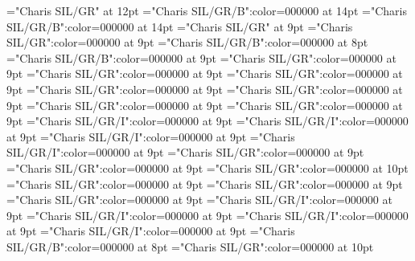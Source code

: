 \documentclass[gps1,twoside]{article}
\begin{document}
\font\xitemtpi="Charis SIL/GR" at 12pt
\font{}="Charis SIL/GR/B":color=000000 at 14pt
\font{}="Charis SIL/GR/B":color=000000 at 14pt
\font{}="Charis SIL/GR" at 9pt
\font\entryletDatadicBody="Charis SIL/GR":color=000000 at 9pt
\font\headwordggoTeluINentryletDatadicBody="Charis SIL/GR/B":color=000000 at 8pt
\font\spanenheadwordggoTeluINentryletDatadicBody="Charis SIL/GR/B":color=000000 at 9pt
\font\pronunciationsentryletDatadicBody="Charis SIL/GR":color=000000 at 9pt
\font\pronunciationggofonipaxemicpronunciationsentryletDatadicBody="Charis SIL/GR":color=000000 at 9pt
\font\spanenpronunciationggofonipaxemicpronunciationsentryletDatadicBody="Charis SIL/GR":color=000000 at 9pt
\font\spanggofonipaxemicpronunciationggofonipaxemicpronunciationsentryletDatadicBody="Charis SIL/GR":color=000000 at 9pt
\font\spanenpronunciationsentryletDatadicBody="Charis SIL/GR":color=000000 at 9pt
\font\sensesentryletDatadicBody="Charis SIL/GR":color=000000 at 9pt
\font\sensesensesentryletDatadicBody="Charis SIL/GR":color=000000 at 9pt
\font\grammaticalinfosensesensesentryletDatadicBody="Charis SIL/GR/I":color=000000 at 9pt
\font\partofspeechengrammaticalinfosensesensesentryletDatadicBody="Charis SIL/GR/I":color=000000 at 9pt
\font\spanenpartofspeechengrammaticalinfosensesensesentryletDatadicBody="Charis SIL/GR/I":color=000000 at 9pt
\font\spanengrammaticalinfosensesensesentryletDatadicBody="Charis SIL/GR/I":color=000000 at 9pt
\font{}="Charis SIL/GR":color=000000 at 9pt
\font\spanendefinitionensensesensesentryletDatadicBody="Charis SIL/GR":color=000000 at 9pt
\font\LexSensepublishStemGlossPubLdtesensesensesentryletDatadicBody="Charis SIL/GR":color=000000 at 10pt
\font\spanteLexSensepublishStemGlossPubLdtesensesensesentryletDatadicBody="Charis SIL/GR":color=000000 at 9pt
\font\spanenLexSensepublishStemGlossPubLdtesensesensesentryletDatadicBody="Charis SIL/GR":color=000000 at 9pt
\font\spanensensesentryletDatadicBody="Charis SIL/GR":color=000000 at 9pt
\font\grammaticalinfosensesentryletDatadicBody="Charis SIL/GR/I":color=000000 at 9pt
\font\partofspeechengrammaticalinfosensesentryletDatadicBody="Charis SIL/GR/I":color=000000 at 9pt
\font\spanenpartofspeechengrammaticalinfosensesentryletDatadicBody="Charis SIL/GR/I":color=000000 at 9pt
\font\spanengrammaticalinfosensesentryletDatadicBody="Charis SIL/GR/I":color=000000 at 9pt
\font\boldxsensenumbersensesensesentryletDatadicBody="Charis SIL/GR/B":color=000000 at 8pt
\font\xitemteLexSensepublishStemGlossPubLdtesensesensesentryletDatadicBody="Charis SIL/GR":color=000000 at 10pt
\end{document}
